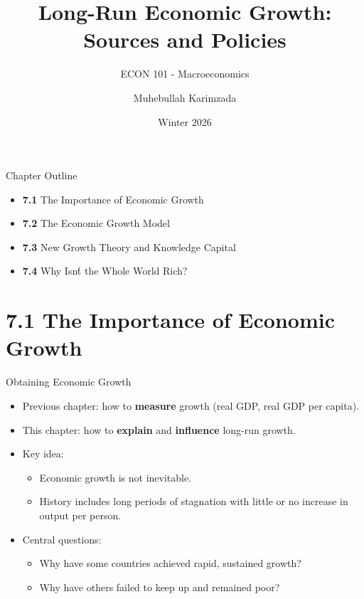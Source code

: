 \documentclass[aspectratio=169]{beamer}
\title{\textbf{Long-Run Economic Growth: Sources and Policies \vspace{.5cm}\\  }}
\subtitle{ {\large ECON 101 - Macroeconomics}}
\author{Muhebullah Karimzada}
\date{Winter 2026}
\begin{document}
\begin{frame}[plain]
  \titlepage
\end{frame}

\begin{frame}{Chapter Outline}
\transfade
\begin{itemize}[<+->]
  \item \textbf{7.1} The Importance of Economic Growth
  \item \textbf{7.2} The Economic Growth Model
  \item \textbf{7.3} New Growth Theory and Knowledge Capital
  \item \textbf{7.4} Why Isn\'t the Whole World Rich?
\end{itemize}
\end{frame}

\section{7.1 The Importance of Economic Growth}

\begin{frame}{Obtaining Economic Growth}
\transfade
\begin{itemize}[<+->]
  \item Previous chapter: how to \textbf{measure} growth (real GDP, real GDP per capita).
  \item This chapter: how to \textbf{explain} and \textbf{influence} long-run growth.
  \item Key idea:
  \begin{itemize}[<+->]
    \item Economic growth is \alert{not inevitable}.
    \item History includes long periods of stagnation with little or no increase in output per person.
  \end{itemize}
  \item Central questions:
  \begin{itemize}[<+->]
    \item Why have some countries achieved rapid, sustained growth?
    \item Why have others failed to keep up and remained poor?
  \end{itemize}
\end{itemize}
\end{frame}
\end{document}
